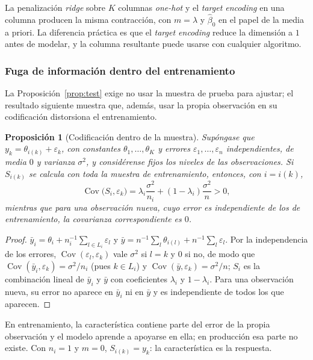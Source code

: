 \documentclass[11pt,a4paper]{article}
\theoremstyle{plain}
\newtheorem{proposicion}[teorema]{Proposición}
\theoremstyle{definition}
\theoremstyle{remark}
\newcommand{\Cov}{\operatorname{Cov}}
\newcommand{\1}{\mathbf{1}}
\begin{document}
La penalización \emph{ridge} sobre $K$ columnas \emph{one-hot} y el
\emph{target encoding} en una columna producen la misma contracción, con
$m=\lambda$ y $\hat\beta_0$ en el papel de la media a priori. La
diferencia práctica es que el \emph{target encoding} reduce la dimensión a
$1$ antes de modelar, y la columna resultante puede usarse con cualquier
algoritmo.

\subsubsection{Fuga de información dentro del entrenamiento}

La Proposición~\ref{prop:test} exige no usar la muestra de prueba para
ajustar; el resultado siguiente muestra que, además, usar la propia
observación en su codificación distorsiona el entrenamiento.

\begin{proposicion}[Codificación dentro de la muestra]\label{prop:te-fuga}
Supóngase que $y_k=\theta_{i(k)}+\varepsilon_k$, con constantes
$\theta_1,\dots,\theta_K$ y errores $\varepsilon_1,\dots,\varepsilon_n$
independientes, de media $0$ y varianza $\sigma^2$, y considérense fijos
los niveles de las observaciones. Si $S_{i(k)}$ se calcula con toda la
muestra de entrenamiento, entonces, con $i=i(k)$,
\[
\Cov\bigl(S_{i},\varepsilon_k\bigr)=\lambda_i\frac{\sigma^2}{n_i}+(1-\lambda_i)\frac{\sigma^2}{n}>0,
\]
mientras que para una observación nueva, cuyo error es independiente de
los de entrenamiento, la covarianza correspondiente es $0$.
\end{proposicion}

\begin{proof}
$\bar y_i=\theta_i+n_i^{-1}\sum_{l\in L_i}\varepsilon_l$ y
$\bar y=n^{-1}\sum_l\theta_{i(l)}+n^{-1}\sum_l\varepsilon_l$. Por la
independencia de los errores, $\Cov(\varepsilon_l,\varepsilon_k)$ vale
$\sigma^2$ si $l=k$ y $0$ si no, de modo que
$\Cov(\bar y_i,\varepsilon_k)=\sigma^2/n_i$ (pues $k\in L_i$) y
$\Cov(\bar y,\varepsilon_k)=\sigma^2/n$; $S_i$ es la combinación lineal
de $\bar y_i$ y $\bar y$ con coeficientes $\lambda_i$ y $1-\lambda_i$. Para
una observación nueva, su error no aparece en $\bar y_i$ ni en $\bar y$ y
es independiente de todos los que aparecen.
\end{proof}

En entrenamiento, la característica contiene parte del error de la propia
observación y el modelo aprende a apoyarse en ella; en producción esa parte
no existe. Con $n_i=1$ y $m=0$, $S_{i(k)}=y_k$: la característica es la
respuesta.
\end{document}
